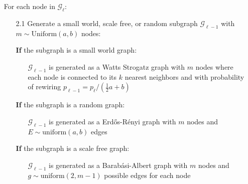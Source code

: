 \documentclass[a4paper,12pt]{article}
\begin{document}
\begin{itemize}
		\begin{itemize}
			\item [] For each node in $\mathcal{G}_\ell$:
			\begin{itemize}
				\item [2.1] Generate a small world, scale free, or random subgraph $\mathcal{G}_{\ell - 1}$ with $m \sim \text{Uniform}(a,b)$ nodes:
				\item [\bf If] the subgraph is a small world graph:
				\begin{itemize}
					\item [] $\mathcal{G}_{\ell - 1}$ is generated as a Watts Strogatz graph with $m$ nodes where each node is connected to its $k$ nearest neighbors and with probability of rewiring $p_{\ell - 1} = p_\ell / (\frac{1}{2}a+b)$  
				\end{itemize}
				\item [\bf If] the subgraph is a random graph:
				\begin{itemize}
					\item [] $\mathcal{G}_{\ell - 1}$ is generated as a Erdős-Rényi graph with $m$ nodes and $E\sim \text{uniform}(a,b)$ edges
				\end{itemize}
				\item [\bf If] the subgraph is a scale free graph:
				\begin{itemize}
					\item [] $\mathcal{G}_{\ell - 1}$ is generated as a Barabási-Albert graph with $m$ nodes and $g \sim \text{uniform}(2, m-1)$ possible edges for each node
				\end{itemize}
			\end{itemize}
		\end{itemize}
		
	\end{itemize}
	
	
	
	
	
	
	
	
	
	
	
	
	
	
	
	

	
	
	
	
	
	
	
	
	
	
\end{document}
